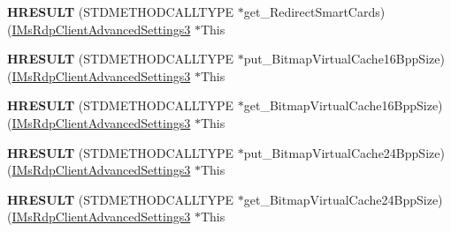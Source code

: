 \begin{DoxyCompactItemize}
{\bfseries H\+R\+E\+S\+U\+LT} (S\+T\+D\+M\+E\+T\+H\+O\+D\+C\+A\+L\+L\+T\+Y\+PE $\ast$get\+\_\+\+Redirect\+Smart\+Cards)(\hyperlink{interface_m_s_t_s_c_lib_1_1_i_ms_rdp_client_advanced_settings3}{I\+Ms\+Rdp\+Client\+Advanced\+Settings3} $\ast$This
\item 
\mbox{\label{struct_m_s_t_s_c_lib_1_1_i_ms_rdp_client_advanced_settings3_vtbl_aece5cf09b54231e563bee5042bbb1173}} 
{\bfseries H\+R\+E\+S\+U\+LT} (S\+T\+D\+M\+E\+T\+H\+O\+D\+C\+A\+L\+L\+T\+Y\+PE $\ast$put\+\_\+\+Bitmap\+Virtual\+Cache16\+Bpp\+Size)(\hyperlink{interface_m_s_t_s_c_lib_1_1_i_ms_rdp_client_advanced_settings3}{I\+Ms\+Rdp\+Client\+Advanced\+Settings3} $\ast$This
\item 
\mbox{\label{struct_m_s_t_s_c_lib_1_1_i_ms_rdp_client_advanced_settings3_vtbl_a7f1942d3befffe886904b9ace8cb45f8}} 
{\bfseries H\+R\+E\+S\+U\+LT} (S\+T\+D\+M\+E\+T\+H\+O\+D\+C\+A\+L\+L\+T\+Y\+PE $\ast$get\+\_\+\+Bitmap\+Virtual\+Cache16\+Bpp\+Size)(\hyperlink{interface_m_s_t_s_c_lib_1_1_i_ms_rdp_client_advanced_settings3}{I\+Ms\+Rdp\+Client\+Advanced\+Settings3} $\ast$This
\item 
\mbox{\label{struct_m_s_t_s_c_lib_1_1_i_ms_rdp_client_advanced_settings3_vtbl_af3831866cf9825fe4a735d66cce49092}} 
{\bfseries H\+R\+E\+S\+U\+LT} (S\+T\+D\+M\+E\+T\+H\+O\+D\+C\+A\+L\+L\+T\+Y\+PE $\ast$put\+\_\+\+Bitmap\+Virtual\+Cache24\+Bpp\+Size)(\hyperlink{interface_m_s_t_s_c_lib_1_1_i_ms_rdp_client_advanced_settings3}{I\+Ms\+Rdp\+Client\+Advanced\+Settings3} $\ast$This
\item 
\mbox{\label{struct_m_s_t_s_c_lib_1_1_i_ms_rdp_client_advanced_settings3_vtbl_a7312bedf4ba15ee324e4a8ae8eb2c6eb}} 
{\bfseries H\+R\+E\+S\+U\+LT} (S\+T\+D\+M\+E\+T\+H\+O\+D\+C\+A\+L\+L\+T\+Y\+PE $\ast$get\+\_\+\+Bitmap\+Virtual\+Cache24\+Bpp\+Size)(\hyperlink{interface_m_s_t_s_c_lib_1_1_i_ms_rdp_client_advanced_settings3}{I\+Ms\+Rdp\+Client\+Advanced\+Settings3} $\ast$This
\item 
\mbox{\label{struct_m_s_t_s_c_lib_1_1_i_ms_rdp_client_advanced_settings3_vtbl_a0a7561ebfd54e5b7a11009d7002b2c20}} 

\end{DoxyCompactItemize}
